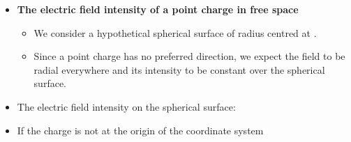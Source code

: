 \begin{ELunit}


\begin{itemize}
\tightlist
\item
  \textbf{The electric field intensity of a point charge  in free space}

  \begin{itemize}
  \tightlist
  \item
    We consider a hypothetical spherical surface of radius  centred at .
  \item
    Since a point charge has no preferred direction, we expect the field to be radial everywhere and its intensity to be constant over the spherical surface.
  \end{itemize}
\end{itemize}


\begin{itemize}
\tightlist
\item
  The electric field intensity on the spherical surface:
\end{itemize}


\end{ELunit}

\begin{ELimportant}{}


\end{ELimportant}

\begin{ELunit}

\begin{itemize}
\tightlist
\item
  If the charge is not at the origin of the coordinate system
\end{itemize}



\end{ELunit}

